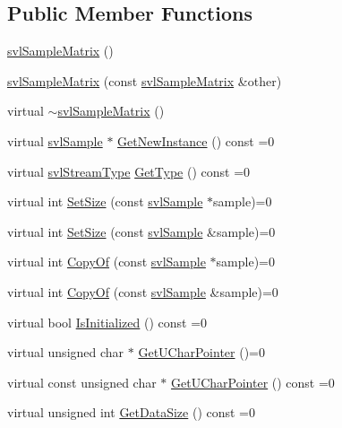 \subsection*{Public Member Functions}
\begin{DoxyCompactItemize}
\item 
\hyperlink{classsvl_sample_matrix_ac053684aa6277b49aa9f68d641622145}{svl\-Sample\-Matrix} ()
\item 
\hyperlink{classsvl_sample_matrix_a51a547258e24eb19ea67935c48f83396}{svl\-Sample\-Matrix} (const \hyperlink{classsvl_sample_matrix}{svl\-Sample\-Matrix} \&other)
\item 
virtual \hyperlink{classsvl_sample_matrix_a73e88acd74815478e4a9216341998d06}{$\sim$svl\-Sample\-Matrix} ()
\item 
virtual \hyperlink{classsvl_sample}{svl\-Sample} $\ast$ \hyperlink{classsvl_sample_matrix_ac7c333173058407963ec92b23b005aa1}{Get\-New\-Instance} () const =0
\item 
virtual \hyperlink{svl_definitions_8h_aa00696d338a58db361335a01fd11e122}{svl\-Stream\-Type} \hyperlink{classsvl_sample_matrix_a4dd585fd19ce4a963375434dc6b1c4a6}{Get\-Type} () const =0
\item 
virtual int \hyperlink{classsvl_sample_matrix_a69e99b2e031b9de429f8db88c857d074}{Set\-Size} (const \hyperlink{classsvl_sample}{svl\-Sample} $\ast$sample)=0
\item 
virtual int \hyperlink{classsvl_sample_matrix_a552f912e6796d601dfab990eb7b1016c}{Set\-Size} (const \hyperlink{classsvl_sample}{svl\-Sample} \&sample)=0
\item 
virtual int \hyperlink{classsvl_sample_matrix_ab1e1189a007f0f591aeb493c988ed56a}{Copy\-Of} (const \hyperlink{classsvl_sample}{svl\-Sample} $\ast$sample)=0
\item 
virtual int \hyperlink{classsvl_sample_matrix_ad47f87a91a5f7216570bf830c99b084d}{Copy\-Of} (const \hyperlink{classsvl_sample}{svl\-Sample} \&sample)=0
\item 
virtual bool \hyperlink{classsvl_sample_matrix_a8a7d21ce32e6dd031cb0de21db1e555d}{Is\-Initialized} () const =0
\item 
virtual unsigned char $\ast$ \hyperlink{classsvl_sample_matrix_a39ba70cdad8a7b9ecce9558b8754c2f5}{Get\-U\-Char\-Pointer} ()=0
\item 
virtual const unsigned char $\ast$ \hyperlink{classsvl_sample_matrix_a624289ca527d6caa36114161d067fb6d}{Get\-U\-Char\-Pointer} () const =0
\item 
virtual unsigned int \hyperlink{classsvl_sample_matrix_a97eb60a0a58c7ccf020ba2398638153a}{Get\-Data\-Size} () const =0

\end{DoxyCompactItemize}
